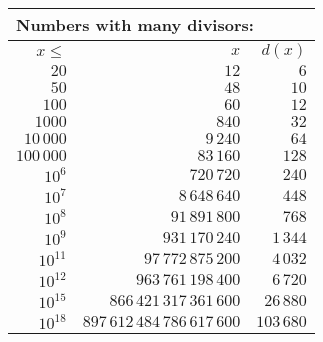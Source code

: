 \begin{center}
\begin{tabular}{|r|r|r|}
\hline
\multicolumn{3}{|l|}{Numbers with many divisors:} \\
\hline
$x \le$ & $x$ & $d(x)$ \\
\hline
$20$ & $12$ & $6$ \\
\hline
$50$ & $48$ & $10$ \\
\hline
$100$ & $60$ & $12$ \\
\hline
$1000$ & $840$ & $32$ \\
\hline
$10\,000$ & $9\,240$ & $64$ \\
\hline
$100\,000$ & $83\,160$ & $128$ \\
\hline
$10^6$ & $720\,720$ & $240$ \\
\hline
$10^7$ & $8\,648\,640$ & $448$ \\
\hline
$10^8$ & $91\,891\,800$ & $768$ \\
\hline
$10^9$ & $931\,170\,240$ & $1\,344$ \\
\hline
$10^{11}$ & $97\,772\,875\,200$ & $4\,032$ \\
\hline
$10^{12}$ & $963\,761\,198\,400$ & $6\,720$ \\
\hline
$10^{15}$ & $866\,421\,317\,361\,600$ & $26\,880$ \\
\hline
$10^{18}$ & $897\,612\,484\,786\,617\,600$ & $103\,680$ \\
\hline
\end{tabular}
\end{center}